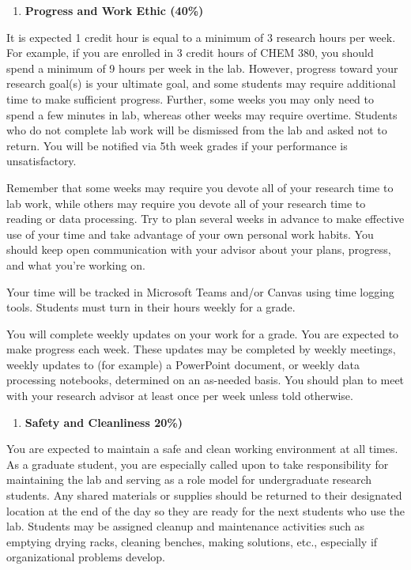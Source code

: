\documentclass[11pt]{article}
\begin{document}
\begin{enumerate}
\item \textbf{Progress and Work Ethic (40\%)}
\end{enumerate}

It is expected 1 credit hour is equal to a minimum of 3 research hours per week. For example, if you are enrolled in 3 credit hours of CHEM 380, you should spend a minimum of 9 hours per week in the lab. However, progress toward your research goal(s) is your ultimate goal, and some students may require additional time to make sufficient progress. Further, some weeks you may only need to spend a few minutes in lab, whereas other weeks may require overtime. Students who do not complete lab work will be dismissed from the lab and asked not to return. You will be notified via 5th week grades if your performance is unsatisfactory.

Remember that some weeks may require you devote all of your research time to lab work, while others may require you devote all of your research time to reading or data processing. Try to plan several weeks in advance to make effective use of your time and take advantage of your own personal work habits. You should keep open communication with your advisor about your plans, progress, and what you’re working on.

Your time will be tracked in Microsoft Teams and/or Canvas using time logging tools. Students must turn in their hours weekly for a grade.

You will complete weekly updates on your work for a grade. You are expected to make progress each week. These updates may be completed by weekly meetings, weekly updates to (for example) a PowerPoint document, or weekly data processing notebooks, determined on an as-needed basis. You should plan to meet with your research advisor at least once per week unless told otherwise.

\begin{enumerate}
\item \textbf{Safety and Cleanliness 20\%)}
\end{enumerate}

You are expected to maintain a safe and clean working environment at all times. As a graduate student, you are especially called upon to take responsibility for maintaining the lab and serving as a role model for undergraduate research students. Any shared materials or supplies should be returned to their designated location at the end of the day so they are ready for the next students who use the lab. Students may be assigned cleanup and maintenance activities such as emptying drying racks, cleaning benches, making solutions, etc., especially if organizational problems develop.
\end{document}
